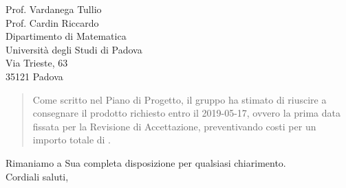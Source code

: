 \begin{letter}{
		Prof. Vardanega Tullio \\
		Prof. Cardin Riccardo \\
		Dipartimento di Matematica \\
		Università degli Studi di Padova \\
		Via Trieste, 63 \\
		35121 Padova}
\begin{quotation}
\noindent Come scritto nel Piano di Progetto, il gruppo ha stimato di riuscire a 
consegnare il prodotto richiesto entro il 2019-05-17, ovvero la prima data 
fissata per la Revisione di Accettazione, preventivando costi per un importo 
totale di .
\end{quotation}

\closing{Rimaniamo a Sua completa disposizione per qualsiasi chiarimento. \\
		Cordiali saluti, }
		
\end{letter}


